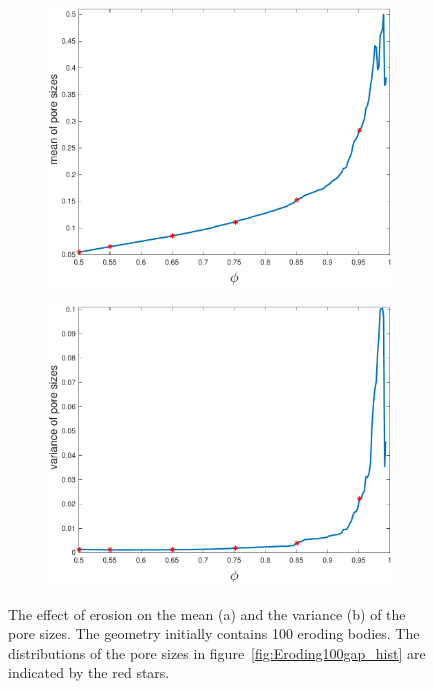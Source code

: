 \documentclass{jfm}
\begin{document}
\begin{figure}
\begin{subfigure}[b]{0.5\textwidth}
\includegraphics*[height = 0.8\linewidth]{./figs/gap_mean}
\caption{}
\end{subfigure}
\begin{subfigure}[b]{0.5\textwidth}
\includegraphics*[height=0.8\linewidth]{./figs/gap_variance}
\caption{}
\end{subfigure}
\caption{\label{fig:Eroding100gap_mean_var} The effect of erosion on the
mean (a) and the variance (b) of the pore sizes. The geometry initially
contains 100 eroding bodies.  The distributions of the pore sizes in
figure~\ref{fig:Eroding100gap_hist} are indicated by the red stars.}
\end{figure}
\end{document}
